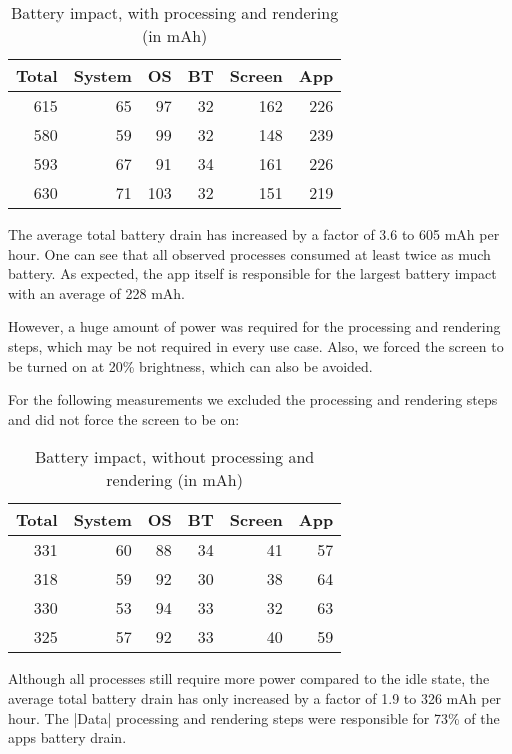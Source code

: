 \begin{table}[H]
    \centering
    \begin{tabular}{rrrrrr}
        Total    & System   & OS       & BT       & Screen   & App  \\ \hline

        615      & 65       & 97       & 32       & 162      & 226  \\
        580      & 59       & 99       & 32       & 148      & 239  \\
        593      & 67       & 91       & 34       & 161      & 226  \\
        630      & 71       & 103      & 32       & 151      & 219  \\
    \end{tabular}
    \caption{Battery impact, with processing and rendering (in mAh)}
    \label{table:benchmark:battery:screen}
\end{table}

The average total battery drain has increased by a factor of 3.6 to 605 mAh per hour.
One can see that all observed processes consumed at least twice as much battery.
As expected, the app itself is responsible for the largest battery impact with an average of 228 mAh.

However, a huge amount of power was required for the processing and rendering steps, which may be not required in every use case.
Also, we forced the screen to be turned on at 20\% brightness, which can also be avoided.

For the following measurements we excluded the processing and rendering steps and did not force the screen to be on:

\begin{table}[H]
    \centering
    \begin{tabular}{rrrrrr}
        Total    & System   & OS       & BT       & Screen   & App  \\ \hline

        331      & 60       & 88       & 34       & 41       & 57   \\
        318      & 59       & 92       & 30       & 38       & 64   \\
        330      & 53       & 94       & 33       & 32       & 63   \\
        325      & 57       & 92       & 33       & 40       & 59   \\
    \end{tabular}
    \caption{Battery impact, without processing and rendering (in mAh)}
    \label{table:benchmark:battery:noscreen}
\end{table}

Although all processes still require more power compared to the idle state, the average total battery drain has only increased by a factor of 1.9 to 326 mAh per hour.
The |Data| processing and rendering steps were responsible for 73\% of the apps battery drain.


\clearpage